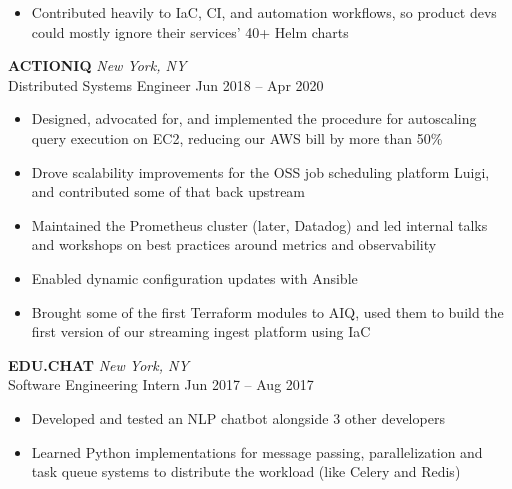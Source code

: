 \documentclass[letterpaper]{article}
\begin{document}
\begin{bgbox}[height=\paperheight, colback=white, width=0.62\textwidth]
\begin{itemize} [noitemsep,topsep=4pt]
			\item Contributed heavily to IaC, CI, and automation workflows, so product devs could mostly ignore their services' 40+ Helm charts
		\end{itemize}
		\vspace*{12pt}
		\textbf{ACTIONIQ} \hfill \textit{New York, NY}\\
		Distributed Systems Engineer \hfill Jun 2018 -- Apr 2020
		\begin{itemize} [noitemsep,topsep=4pt]
			\item Designed, advocated for, and implemented the procedure for autoscaling query execution on EC2, reducing our AWS bill by more than 50\%
			\item Drove scalability improvements for the OSS job scheduling platform Luigi, and contributed some of that back upstream
			\item Maintained the Prometheus cluster (later, Datadog) and led internal talks and workshops on best practices around metrics and observability
			\item Enabled dynamic configuration updates with Ansible
			\item Brought some of the first Terraform modules to AIQ, used them to build \linebreak the first version of our streaming ingest platform using IaC
		\end{itemize}
		\vspace*{12pt}
		\textbf{EDU.CHAT} \hfill \textit{New York, NY}\\
		Software Engineering Intern \hfill Jun 2017 -- Aug 2017
		\begin{itemize} [noitemsep,topsep=4pt]
			\item Developed and tested an NLP chatbot alongside 3 other developers
			\item Learned Python implementations for message passing, parallelization and task queue systems to distribute the workload (like Celery and Redis)
		\end{itemize}
	\end{bgbox}%
\end{document}

